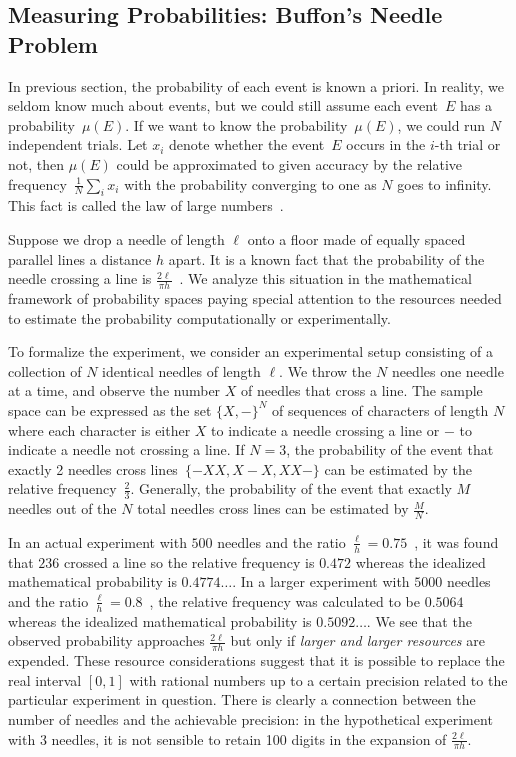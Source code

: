\documentclass{article}
\theoremstyle{remark}
\newcommand{\pmeas}{\ensuremath{\mu}}
\begin{document}
\subsection{Measuring Probabilities: Buffon's Needle
Problem\label{subsec:Measuring-Probabilities:-Buffon}}
 
In previous section, the probability of each event is known
a priori. In reality, we seldom know much about events, but we could still assume
each event~$E$ has a probability~$\pmeas(E)$. If we want to know the
probability~$\pmeas(E)$, we could run $N$ independent trials. Let $x_{i}$ denote
whether the event~$E$ occurs in the $i$-th trial or not, then $\pmeas(E)$ could
be approximated to given accuracy by the relative
frequency~$\frac{1}{N}\sum_{i}x_{i}$ with the probability converging to one as
$N$ goes to infinity. This fact is called the law of large
numbers~\cite{Bernoulli2006,Kolmogorov1950,Uspensky1937,Shafer1976,544199}.

Suppose we drop a needle of length $\ell$ onto a floor made of equally
spaced parallel lines a distance $h$ apart. It is a known fact that
the probability of the needle crossing a line is
$\frac{2\ell}{\pi h}$~\cite{Buffon1777,DeMorgan1872,Hall1873,Uspensky1937}.
We analyze this situation in the mathematical framework of probability
spaces paying special attention to the resources needed to estimate
the probability computationally or experimentally.

To formalize the experiment, we consider an experimental setup
consisting of a collection of $N$ identical needles of length
$\ell$. We throw the $N$ needles one needle at a time, and observe the number
$X$ of needles that cross a line. The sample space can be expressed as the set
$\{X,-\}^N$
of sequences of characters of length $N$ where each character is
either $X$ to indicate a needle crossing a line or $-$ to indicate a
needle not crossing a line. If $N=3$, the probability of the event that exactly
2 needles cross lines~$\{-XX,X{-}X,XX-\}$ can be 
estimated by the relative frequency~$\frac{2}{3}$. Generally, the probability of
the event that exactly $M$ needles out of the $N$ total needles cross lines can
be estimated by $\frac{M}{N}$.

In an actual experiment with $500$ needles and the ratio
$\frac{\ell}{h}=0.75$~\cite{Hall1873}, it was found that $236$ crossed
a line so the relative frequency is $0.472$ whereas the idealized
mathematical probability is $0.4774\ldots$. In a larger experiment
with $5000$ needles and the ratio
$\frac{\ell}{h}=0.8$~\cite{Uspensky1937}, the relative frequency was
calculated to be $0.5064$ whereas the idealized mathematical
probability is $0.5092\ldots$. We see that the observed probability
approaches $\frac{2\ell}{\pi h}$ but only if \emph{larger and larger
  resources} are expended. These resource considerations suggest that
it is possible to replace the real interval $[0,1]$ with rational
numbers up to a certain precision related to the particular experiment
in question.  There is clearly a connection between the number of
needles and the achievable precision: in the hypothetical experiment
with 3 needles, it is not sensible to retain 100 digits in the
expansion of $\frac{2\ell}{\pi h}$.
\end{document}
